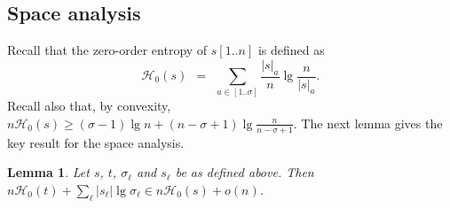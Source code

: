 \documentclass[11pt]{article}
\newtheorem{lemma}[theorem]{Lemma}
\newcommand{\occ}[2]
    {\ensuremath{|{#2}|_{#1}}}
\newcommand{\HH}{\mathcal{H}}
\newcommand{\Ho}{\HH_0}
\begin{document}
\subsection{Space analysis}
\label{sec:anal}

Recall that the zero-order entropy of $s[1..n]$ is defined as
\begin{equation} \label{eq:H}
\Ho(s) ~~=~~ \sum_{a\in[1..\sigma]}
\frac{\occ{a}{s}}{n}\lg\frac{n}{\occ{a}{s}}.
\end{equation}
Recall also that, by convexity, $n\Ho(s) \ge (\sigma-1)\lg n +
(n-\sigma+1)\lg \frac{n}{n-\sigma+1}$.  The next lemma gives the key
result for the space analysis.

\begin{lemma} \label{lem:space}
Let $s$, $t$, $\sigma_\ell$ and $s_\ell$ be as defined above. Then
$n\Ho(t) + \sum_\ell |s_\ell|\lg\sigma_\ell \in n\Ho(s) + o(n)$.
\end{lemma}
\end{document}
